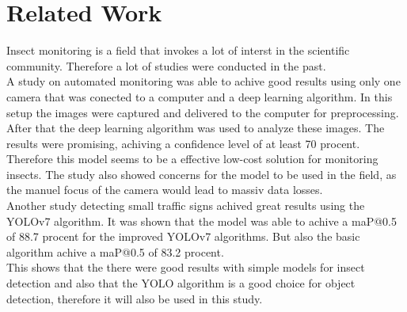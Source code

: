 \chapter{Related Work}
\label{ch:related_work}

Insect monitoring is a field that invokes a lot of interst in the scientific community. Therefore a lot of studies were conducted in the past. \\

A study on automated monitoring was able to achive good results using only one camera that was conected to a computer and a deep learning algorithm. In this setup the images were captured and delivered to the computer for preprocessing. After that the deep learning algorithm was used to analyze these images. The results were promising, achiving a confidence level of at least 70 procent. \citep{mendoza2023} \\
Therefore this model seems to be a effective low-cost solution for monitoring insects. The study also showed concerns for the model to be used in the field, as the manuel focus of the camera would lead to massiv data losses. \citep{mendoza2023} \\ 

Another study detecting small traffic signs achived great results using the YOLOv7 algorithm. It was shown that the model was able to achive a maP@0.5 of 88.7 procent for the improved YOLOv7 algorithms. But also the basic algorithm achive a maP@0.5 of 83.2 procent. \citep{li2023} \\

This shows that the there were good results with simple models for insect detection and also that the YOLO algorithm is a good choice for object detection, therefore it will also be used in this study. 